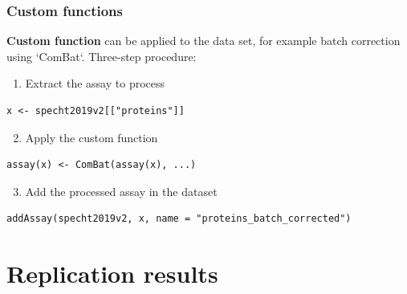 \documentclass{beamer}
\newcommand{\frametitlesection}[1]{\frametitle{\centering #1 \footnotesize \hspace{0pt plus 1 filll} \insertsection}}
\begin{document}
\begin{frame}[fragile]
    \frametitlesection{Custom functions}

    \textbf{Custom function} can be applied to the data set, for example batch
    correction using `ComBat`. Three-step procedure:

    \begin{enumerate}
        \item Extract the assay to process
    \end{enumerate}

    \begin{lstlisting}[basicstyle = \scriptsize\ttfamily\color{vdgray}]
x <- specht2019v2[["proteins"]]
    \end{lstlisting}

    \begin{enumerate}
        \setcounter{enumi}{1}
        \item Apply the custom function
    \end{enumerate}

    \begin{lstlisting}[firstnumber=2,  basicstyle = \scriptsize\ttfamily\color{vdgray}]
assay(x) <- ComBat(assay(x), ...)
    \end{lstlisting}

    \begin{enumerate}
        \setcounter{enumi}{2}
        \item Add the processed assay in the dataset
    \end{enumerate}

    \begin{lstlisting}[firstnumber=3,  basicstyle = \scriptsize\ttfamily\color{vdgray}]
addAssay(specht2019v2, x, name = "proteins_batch_corrected")
    \end{lstlisting}


\end{frame}


\section{Replication results}
\end{document}
